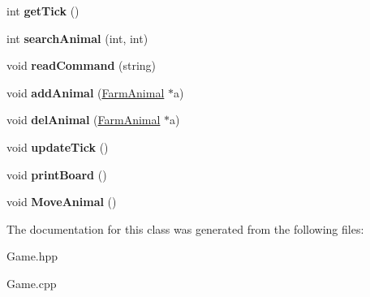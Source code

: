 \begin{DoxyCompactItemize}
int {\bfseries get\+Tick} ()
\item 
\mbox{\label{class_game_a7bb8675d8cab74262d84602c085b41b7}} 
int {\bfseries search\+Animal} (int, int)
\item 
\mbox{\label{class_game_ad71be7fa0b17d9117808e539dce3348f}} 
void {\bfseries read\+Command} (string)
\item 
\mbox{\label{class_game_aa3b011db0dc827b5b0311a20a6b281ce}} 
void {\bfseries add\+Animal} (\mbox{\hyperlink{class_farm_animal}{Farm\+Animal}} $\ast$a)
\item 
\mbox{\label{class_game_a38f5c1e96f8d67dbe93e5a7c4578f089}} 
void {\bfseries del\+Animal} (\mbox{\hyperlink{class_farm_animal}{Farm\+Animal}} $\ast$a)
\item 
\mbox{\label{class_game_a318a2600b1e4128677a50c8d3dda68c7}} 
void {\bfseries update\+Tick} ()
\item 
\mbox{\label{class_game_a77611c82d15d9a191655ca57231908da}} 
void {\bfseries print\+Board} ()
\item 
\mbox{\label{class_game_aa2fa3509bab084bdd42e56deeda69a2a}} 
void {\bfseries Move\+Animal} ()
\end{DoxyCompactItemize}


The documentation for this class was generated from the following files\+:\begin{DoxyCompactItemize}
\item 
Game.\+hpp\item 
Game.\+cpp\end{DoxyCompactItemize}
